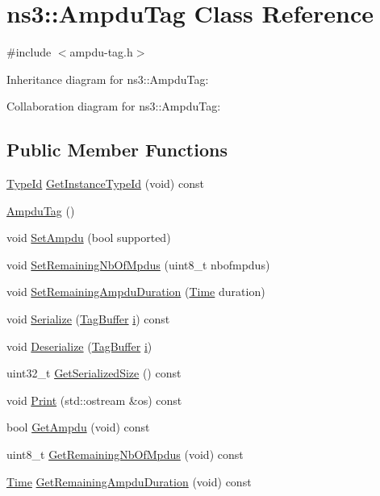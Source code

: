 \hypertarget{classns3_1_1AmpduTag}{}\section{ns3\+:\+:Ampdu\+Tag Class Reference}
\label{classns3_1_1AmpduTag}


{\ttfamily \#include $<$ampdu-\/tag.\+h$>$}



Inheritance diagram for ns3\+:\+:Ampdu\+Tag\+:


Collaboration diagram for ns3\+:\+:Ampdu\+Tag\+:
\subsection*{Public Member Functions}
\begin{DoxyCompactItemize}
\item 
\hyperlink{classns3_1_1TypeId}{Type\+Id} \hyperlink{classns3_1_1AmpduTag_ab4b9ad0ffc25bb4b8c3280050ac86bd9}{Get\+Instance\+Type\+Id} (void) const 
\item 
\hyperlink{classns3_1_1AmpduTag_a0ea8070bb4dcb12f720cbe2a9a5c502a}{Ampdu\+Tag} ()
\item 
void \hyperlink{classns3_1_1AmpduTag_a2d6bb8c8aedd27f98a55d6d09512514b}{Set\+Ampdu} (bool supported)
\item 
void \hyperlink{classns3_1_1AmpduTag_ae1d886252977069594b65dc7467c9367}{Set\+Remaining\+Nb\+Of\+Mpdus} (uint8\+\_\+t nbofmpdus)
\item 
void \hyperlink{classns3_1_1AmpduTag_a9b907f46acd800c833aba6f13c6db846}{Set\+Remaining\+Ampdu\+Duration} (\hyperlink{classns3_1_1Time}{Time} duration)
\item 
void \hyperlink{classns3_1_1AmpduTag_a6ff104a3b41cc261a6d727916989f4d3}{Serialize} (\hyperlink{classns3_1_1TagBuffer}{Tag\+Buffer} \hyperlink{lte__uplink__power__control_8m_a6f6ccfcf58b31cb6412107d9d5281426}{i}) const 
\item 
void \hyperlink{classns3_1_1AmpduTag_aa9b9edcdae432bde2a2af250918d195e}{Deserialize} (\hyperlink{classns3_1_1TagBuffer}{Tag\+Buffer} \hyperlink{lte__uplink__power__control_8m_a6f6ccfcf58b31cb6412107d9d5281426}{i})
\item 
uint32\+\_\+t \hyperlink{classns3_1_1AmpduTag_a91940bfffdfcdbb5d58de480bda77fa9}{Get\+Serialized\+Size} () const 
\item 
void \hyperlink{classns3_1_1AmpduTag_a321ef759ebf471e6e18d50486641e480}{Print} (std\+::ostream \&os) const 
\item 
bool \hyperlink{classns3_1_1AmpduTag_a942c10efc4f6fab0786a92da679535a3}{Get\+Ampdu} (void) const 
\item 
uint8\+\_\+t \hyperlink{classns3_1_1AmpduTag_ab5d79e860e55b62e8aa0f3db97713e26}{Get\+Remaining\+Nb\+Of\+Mpdus} (void) const 
\item 
\hyperlink{classns3_1_1Time}{Time} \hyperlink{classns3_1_1AmpduTag_a8e0137ed1d4726e82cb81aabf9d38a3d}{Get\+Remaining\+Ampdu\+Duration} (void) const 
\end{DoxyCompactItemize}
